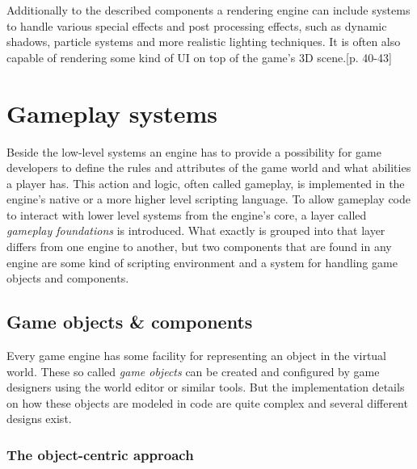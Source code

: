 Additionally to the described components a rendering engine can include systems to handle various special effects and post processing effects, such as dynamic shadows, particle systems and more realistic lighting techniques. It is often also capable of rendering some kind of \ac{UI} on top of the game's 3D scene.\cite{GEA_2}[p. 40-43]

\section{Gameplay systems}

Beside the low-level systems an engine has to provide a possibility for game developers to define the rules and attributes of the game world and what abilities a player has. This action and logic, often called gameplay, is implemented in the engine's native or a more higher level scripting language. To allow gameplay code to interact with lower level systems from the engine's core, a layer called \textit{gameplay foundations} is introduced. What exactly is grouped into that layer differs from one engine to another, but two components that are found in any engine are some kind of scripting environment and a system for handling game objects and components.

\subsection{Game objects \& components}

Every game engine has some facility for representing an object in the virtual world. These so called \textit{game objects} can be created and configured by game designers using the world editor or similar tools. But the implementation details on how these objects are modeled in code are quite complex and several different designs exist. 

\subsubsection{The object-centric approach}

